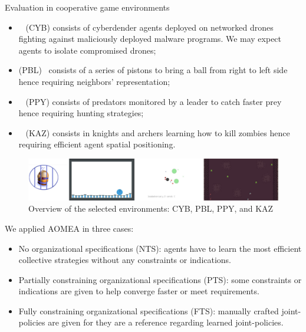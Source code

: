 \begin{frame}{Evaluation in cooperative game environments}
    \begin{itemize}
        \item {}~\cite{cage_challenge_3_announcement} (CYB) consists of cyberdender agents deployed on networked drones fighting against maliciously deployed malware programs. We may expect agents to \allowbreak isolate compromised drones;
        \item {} (PBL)~\cite{Terry2021} consists of a series of pistons to bring a ball from right to left side hence requiring neighbors' representation;
        \item {}~\cite{Lowe2017} (PPY) consists of predators monitored by a leader to catch faster prey hence requiring hunting strategies;
        \item {}~\cite{Terry2021} (KAZ) consists in knights and archers learning how to kill zombies hence requiring efficient agent spatial positioning.
    \end{itemize}
    \begin{figure}[H]
        \centering
        \includegraphics[width=0.8\linewidth]{figures/envs_4x1.png}
        \caption{Overview of the selected environments: CYB, PBL, PPY, and KAZ}
        \label{fig:simulated_environments}
    \end{figure}
    \noindent We applied AOMEA in three cases:
    \begin{itemize}
        \item No organizational specifications (NTS): agents have to learn the most efficient collective strategies without any constraints or indications.
        \item Partially constraining organizational specifications (PTS): some constraints or indications are given to help converge faster or meet requirements.
        \item Fully constraining organizational specifications (FTS): manually crafted joint-policies are given for they are a reference regarding learned joint-policies.
    \end{itemize}


\end{frame}
